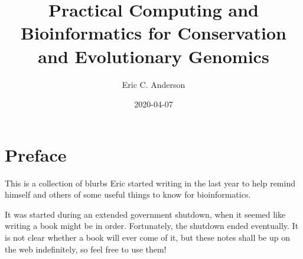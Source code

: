 \documentclass[]{krantz}
\title{Practical Computing and Bioinformatics for Conservation and Evolutionary Genomics}
\author{Eric C. Anderson}
\date{2020-04-07}
\begin{document}
\maketitle


\thispagestyle{empty}

\begin{center}

\end{center}

\setlength{\abovedisplayskip}{-5pt}
\setlength{\abovedisplayshortskip}{-5pt}

{
\hypersetup{linkcolor=}
\setcounter{tocdepth}{2}
\tableofcontents
}
\listoftables
\listoffigures
\newcommand{\bitsfa}{{\circ}{\circ}{\circ}{\bullet}}
\newcommand{\bitsfb}{{\circ}{\circ}{\bullet}{\circ}}
\newcommand{\bitsfc}{{\circ}{\bullet}{\circ}{\circ}}
\newcommand{\bitsfd}{{\bullet}{\circ}{\circ}{\circ}}
\newcommand{\bitsopen}{{\circ}{\circ}{\circ}{\circ}}

\newcommand{\bitsa}{\bitsopen~\bitsopen~\bitsfa}
\newcommand{\bitsb}{\bitsopen~\bitsopen~\bitsfb}
\newcommand{\bitsc}{\bitsopen~\bitsopen~\bitsfc}
\newcommand{\bitsd}{\bitsopen~\bitsopen~\bitsfd}

\newcommand{\bitse}{\bitsopen~\bitsfa~\bitsopen}
\newcommand{\bitsf}{\bitsopen~\bitsfb~\bitsopen}
\newcommand{\bitsg}{\bitsopen~\bitsfc~\bitsopen}
\newcommand{\bitsh}{\bitsopen~\bitsfd~\bitsopen}

\newcommand{\bitsi}{\bitsfa~\bitsopen~\bitsopen}
\newcommand{\bitsj}{\bitsfb~\bitsopen~\bitsopen}
\newcommand{\bitsk}{\bitsfc~\bitsopen~\bitsopen}
\newcommand{\bitsl}{\bitsfd~\bitsopen~\bitsopen}
\newcommand{\bitsmany}{\bitsopen~{\circ}{\bullet}{\circ}{\bullet}~{\circ}{\circ}{\bullet}{\bullet}}

\hypertarget{preface}{%
\chapter*{Preface}\label{preface}}


This is a collection of blurbs Eric started writing in the last year to
help remind himself and others of some useful things to know for bioinformatics.

It was started during an extended government shutdown, when it seemed like writing a book
might be in order. Fortunately, the shutdown ended eventually. It is not clear whether a
book will ever come of it, but these notes shall be up on the web indefinitely, so feel free to use
them!
\end{document}
